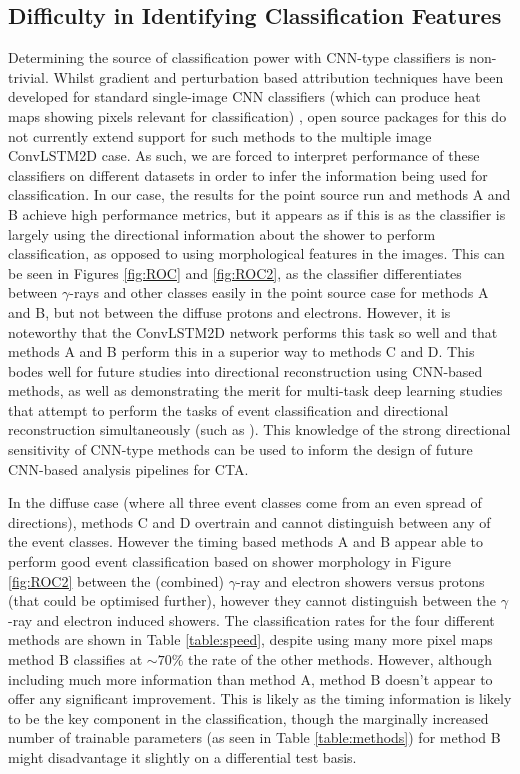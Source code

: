 \subsection{Difficulty in Identifying Classification Features}
Determining the source of classification power with CNN-type classifiers is non-trivial. Whilst gradient and perturbation based attribution techniques have been developed for standard single-image CNN classifiers (which can produce heat maps showing pixels relevant for classification) \cite{deepexplain}, open source packages for this do not currently extend support for such methods to the multiple image ConvLSTM2D case. As such, we are forced to interpret performance of these classifiers on different datasets in order to infer the information being used for classification. In our case, the results for the point source run and methods A and B achieve high performance metrics, but it appears as if this is as the classifier is largely using the directional information about the shower to perform classification, as opposed to using morphological features in the images. This can be seen in Figures \ref{fig:ROC} and \ref{fig:ROC2}, as the classifier differentiates between $\gamma$-rays and other classes easily in the point source case for methods A and B, but not between the diffuse protons and electrons. However, it is noteworthy that the ConvLSTM2D network performs this task so well and that methods A and B perform this in a superior way to methods C and D. This bodes well for future studies into directional reconstruction using CNN-based methods, as well as demonstrating the merit for multi-task deep learning studies that attempt to perform the tasks of event classification and directional reconstruction simultaneously (such as \cite{jacquemont}). This knowledge of the strong directional sensitivity of CNN-type methods can be used to inform the design of future CNN-based analysis pipelines for CTA.

In the diffuse case (where all three event classes come from an even spread of directions), methods C and D overtrain and cannot distinguish between any of the event classes. However the timing based methods A and B appear able to perform good event classification based on shower morphology in Figure \ref{fig:ROC2} between the (combined) $\gamma$-ray and electron showers versus protons (that could be optimised further), however they cannot distinguish between the $\gamma$-ray and electron induced showers. The classification rates for the four different methods are shown in Table \ref{table:speed}, despite using many more pixel maps method B classifies at $\sim 70\%$ the rate of the other methods. However, although including much more information than method A, method B doesn't appear to offer any significant improvement. This is likely as the timing information is likely to be the key component in the classification, though the marginally increased number of trainable parameters (as seen in Table \ref{table:methods}) for method B might disadvantage it slightly on a differential test basis.

